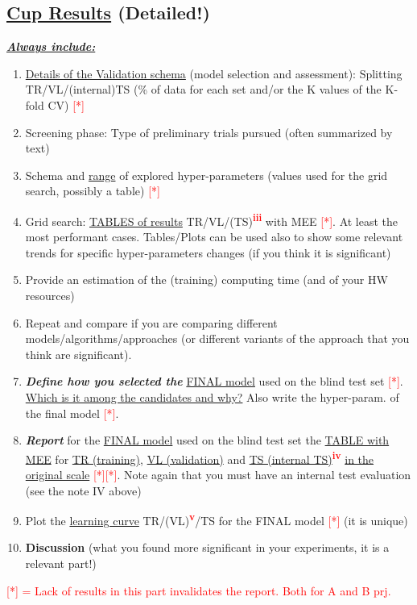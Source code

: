 \documentclass[12pt, letterpaper]{article}  %
\begin{document}
\subsection{\underline{Cup Results} (Detailed!)}
\underline{\textbf{\textit{Always include:}}}
\begin{enumerate}
    \setlength\itemsep{-0.2em}
    \item \underline{Details of the Validation schema} (model selection and assessment): Splitting \\ TR/VL/(internal)TS (\% of data for each set and/or the K values of the K-fold CV)  \textcolor{red}{[*]}
    \item Screening phase: Type of preliminary trials pursued (often summarized by text) 
    \item Schema and \underline{range} of explored hyper-parameters (values used for the grid search, possibly a table) \textcolor{red}{[*]}
    \item Grid search: \underline{TABLES of results} TR/VL/(TS)\textsuperscript{\textbf{\textcolor{red}{iii}}} with MEE \textcolor{red}{[*]}. At least the most performant cases. Tables/Plots can be used also to show some relevant trends for specific hyper-parameters changes (if you think it is significant) 
    \item Provide an estimation of the (training) computing time (and of your HW resources)
    \item Repeat and compare if you are comparing different models/algorithms/approaches (or different variants of the approach that you think are significant). 
    \item \textbf{\textit{Define how you selected the}} \underline{FINAL model} used on the blind test set \textcolor{red}{[*]}. \underline{Which is it among the candidates and why?} Also write the  hyper-param. of the final model \textcolor{red}{[*]}.
    \item \textbf{\textit{Report}} for the \underline{FINAL model} used on the blind test set the \underline{TABLE with MEE} for \underline{TR (training)}, \underline{VL (validation)} and \underline{TS (internal TS)}\textsuperscript{\textbf{\textcolor{red}{iv}}} \underline{in the original scale} \textcolor{red}{[*]}\textcolor{red}{[*]}. Note again  that you must have an internal  test evaluation (see the note IV above)
    \item Plot the \underline{learning curve} TR/(VL)\textsuperscript{\textbf{\textcolor{red}{v}}}/TS for the  FINAL model \textcolor{red}{[*]} (it is unique) 
    \item \textbf{Discussion} (what you found more significant in your experiments, it is a relevant part!)
\end{enumerate}
\textcolor{red}{[*] = Lack of results in this part invalidates the report. Both for A and B prj.} \\
\end{document}
